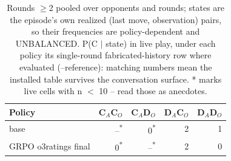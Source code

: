 \begin{table}[t]
\centering
\caption{Rounds $\geq$2 pooled over opponents and rounds; states are the episode's own realized (last move, observation) pairs, so their frequencies are policy-dependent and UNBALANCED. P(C $\mid$ state) in live play, under each policy its single-round fabricated-history row where evaluated (--reference): matching numbers mean the installed table survives the conversation surface. * marks live cells with n $<$ 10 -- read those as anecdotes.}
\label{tab:mr-live-states}
\small
\setlength{\tabcolsep}{3.5pt}
\begin{tabular}{lrrrr}
\toprule
Policy & C$_A$C$_O$ & C$_A$D$_O$ & D$_A$C$_O$ & D$_A$D$_O$ \\
\midrule
base & --\textsuperscript{*} & 0\textsuperscript{*} & 2 & 1 \\
GRPO o3ratings final & 0\textsuperscript{*} & --\textsuperscript{*} & 2 & 0 \\
\bottomrule
\end{tabular}
\end{table}
